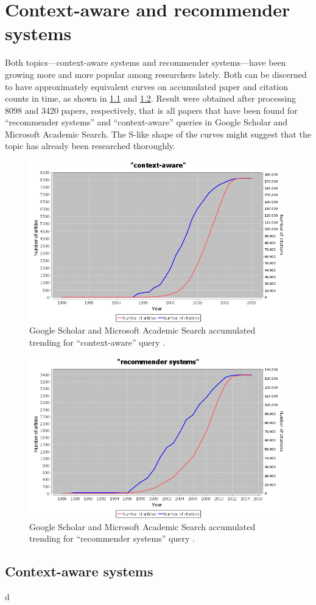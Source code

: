 \chapter{Context-aware and recommender systems}
\label{cha:recommenders}

Both topics---context-aware systems and recommender systems---have been growing more and more popular among researchers lately. Both can be discerned to have approximately equivalent curves on accumulated paper and citation counts in time, as shown in \cref{fig:scholar-context-aware} and \cref{fig:scholar-recommender-systems}. Result were obtained after processing 8098 and 3420 papers, respectively, that is all papers that have been found for ``recommender systems'' and ``context-aware'' queries in Google Scholar and Microsoft Academic Search. The S-like shape of the curves might suggest that the topic has already been researched thoroughly.

\begin{figure}
	\centering
	\includegraphics[width=\textwidth]{scholar-context-aware}
	\caption{Google Scholar and Microsoft Academic Search accumulated trending for ``context-aware'' query \cite{Rus:scholar-trends}.}
	\label{fig:scholar-context-aware}
\end{figure}

\begin{figure}
	\centering
	\includegraphics[width=\textwidth]{scholar-recommender-systems}
	\caption{Google Scholar and Microsoft Academic Search accumulated trending for ``recommender systems'' query \cite{Rus:scholar-trends}.}
	\label{fig:scholar-recommender-systems}
\end{figure}

\section{Context-aware systems}

d
